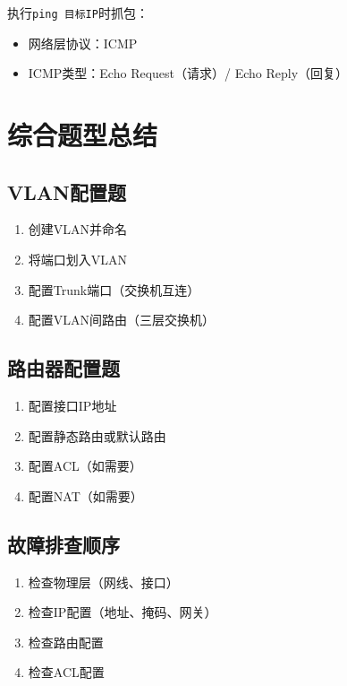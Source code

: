 \documentclass[12pt,a4paper]{ctexart}
\begin{document}
\begin{exambox}[Ping命令分析]
执行\texttt{ping 目标IP}时抓包：
\begin{itemize}[itemsep=0pt]
    \item 网络层协议：ICMP
    \item ICMP类型：Echo Request（请求）/ Echo Reply（回复）
\end{itemize}
\end{exambox}

\section{综合题型总结}

\subsection{VLAN配置题}

\begin{enumerate}[leftmargin=2em,itemsep=0pt]
    \item 创建VLAN并命名
    \item 将端口划入VLAN
    \item 配置Trunk端口（交换机互连）
    \item 配置VLAN间路由（三层交换机）
\end{enumerate}

\subsection{路由器配置题}

\begin{enumerate}[leftmargin=2em,itemsep=0pt]
    \item 配置接口IP地址
    \item 配置静态路由或默认路由
    \item 配置ACL（如需要）
    \item 配置NAT（如需要）
\end{enumerate}

\subsection{故障排查顺序}

\begin{enumerate}[leftmargin=2em,itemsep=0pt]
    \item 检查物理层（网线、接口）
    \item 检查IP配置（地址、掩码、网关）
    \item 检查路由配置
    \item 检查ACL配置
\end{enumerate}
\end{document}
